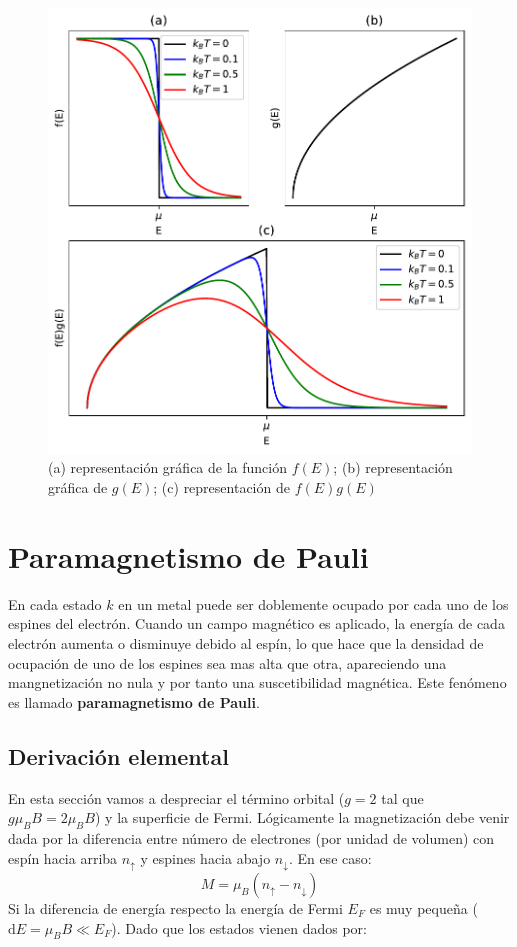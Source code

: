 \documentclass[12pt,a4paper]{book}
\numberwithin{equation}{section}
\numberwithin{figure}{section}
\newcommand{\D}{\mathrm{d}}
\begin{document}
\begin{figure}[h!]
    \centering
    \includegraphics[scale=1]{Imagenes/07-Fermi-function.pdf}
    \caption{(a) representación gráfica de la función $f(E)$; (b) representación gráfica de $g(E)$; (c) representación de $f(E)g(E)$}
    \label{Fig:07-02-01}
\end{figure}

\section{Paramagnetismo de Pauli}
En cada estado $k$ en un metal puede ser doblemente ocupado por cada uno de los espines del electrón. Cuando un campo magnético es aplicado, la energía de cada electrón aumenta o disminuye debido al espín, lo que hace que la densidad de ocupación de uno de los espines sea mas alta que otra, apareciendo una mangnetización no nula y por tanto una suscetibilidad magnética. Este fenómeno es llamado \textbf{paramagnetismo de Pauli}. 

\subsection{Derivación elemental}
En esta sección vamos a despreciar el término orbital ($g=2$ tal que $g \mu_B B = 2 \mu_B B$) y la superficie de Fermi. Lógicamente la magnetización debe venir dada por la diferencia entre número de electrones (por unidad de volumen) con espín hacia arriba $n_\uparrow$ y espines hacia abajo $n_\downarrow$. En ese caso:
\begin{equation}
    M = \mu_B (n_\uparrow - n_\downarrow) 
\end{equation}
Si la diferencia de energía respecto la energía de Fermi $E_F$ es muy pequeña ($\D E = \mu_B B \ll E_F$). Dado que los estados vienen dados por:
\end{document}
